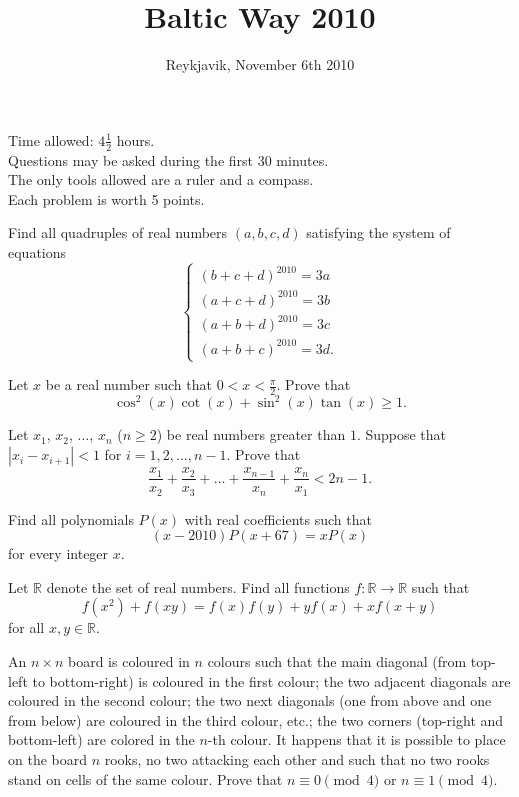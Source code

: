 \documentclass[11pt,a4paper]{amsart}
\title{Baltic Way 2010}
\author[Baltic Way 2010]{Reykjavik, November 6th 2010}
\theoremstyle{definition}
\newcommand{\R}{\mathbb{R}}
\begin{document}
\maketitle
\thispagestyle{bw}

\noindent
Time allowed: $4\frac12$ hours.\\
Questions may be asked during the first 30 minutes.\\
The only tools allowed are a ruler and a compass.\\
Each problem is worth 5 points.\\




\maketitle

\prob
Find all quadruples of real numbers $(a,b,c,d)$ satisfying the system of equations
\[\begin{cases}
  (b+c+d)^{2010}=3a \\
  (a+c+d)^{2010}=3b \\
  (a+b+d)^{2010}=3c \\
  (a+b+c)^{2010}=3d.
\end{cases}\]



\prob
Let $x$ be a real number such that $0<x<\frac{\pi}{2}$. Prove that
\[
\cos^2 (x)\cot (x)+\sin^2 (x)\tan (x)\ge 1.\]


\prob
Let $x_1$, $x_2$, $\ldots$, $x_n$ ($n\geq 2$) be real numbers
greater than $1$. Suppose that $|x_i-x_{i+1}|<1$ for $i=1,2,\ldots,n-1$.
Prove that
$$\frac{x_1}{x_2}+\frac{x_2}{x_3}+\ldots+\frac{x_{n-1}}{x_n}+\frac{x_n}{x_1}<2n-1.$$


\prob
Find all polynomials $P(x)$ with real coefficients such that
\[(x-2010)P(x+67)=xP(x)\]
for every integer $x$.


\prob
Let $\R$ denote the set of real numbers. Find all functions $f:\R\rightarrow\R$ such that
\[f(x^2)+f(xy)=f(x)f(y)+yf(x)+xf(x+y)\]
for all $x,y\in\R.$


\prob
An $n\times n$ board is coloured in $n$ colours such that
the main diagonal (from top-left to bottom-right) is coloured in the first colour;
the two adjacent diagonals are coloured in the second colour; the two next diagonals
(one from above and one from below) are coloured in the third colour, etc.;
the two corners (top-right and bottom-left) are colored in the $n$-th colour.
It happens that it is possible to place on the board $n$ rooks, no two attacking each other and 
such that no two rooks stand on cells of the same colour.
Prove that $n\equiv 0\pmod{4}$ or $n\equiv 1\pmod{4}$.
\end{document}
